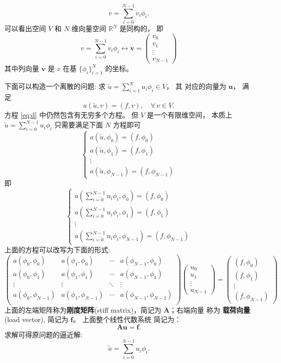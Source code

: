 \documentclass{article}
\begin{document}
$$
v = \sum\limits_{i=0}^{N-1} v_i\phi_i.
$$
可以看出空间 $V$ 和 $N$ 维向量空间 $\mathbb{R}^N$ 是同构的， 即
$$
v = \sum\limits_{i=0}^{N-1} v_i\phi_i\leftrightarrow\mathbf{v} =
\begin{pmatrix}
    v_0 \\ v_1 \\ \vdots \\ v_{N-1}
\end{pmatrix}
$$
其中列向量 $\mathbf{v}$ 是 $v$ 在基 $\{\phi_i\}_{i=1}^N$ 的坐标。 

下面可以构造一个离散的问题: 求 $ \tilde u = \sum_{i=1}^{N}u_i \phi_i \in V$， 其
对应的向量为 $\mathbf u$， 满足
\begin{equation}
    \label{eq:d}
    a(\tilde u, v) = (f, v),
    \quad\forall~v\in V.
\end{equation}
方程 \eqref{eq:d} 中仍然包含有无穷多个方程。 但 $V$ 是一个有限维空间， 本质上
$\tilde u= \sum_{i=0}^{N-1}u_i \phi_i$ 只需要满足下面 $N$ 方程即可
$$
\begin{cases}
    a(\tilde u, \phi_0) = (f, \phi_0) \\
    a(\tilde u, \phi_1) = (f, \phi_1) \\
    \vdots \\
    a(\tilde u, \phi_{N-1}) = (f, \phi_{N-1})
\end{cases}
$$
即
$$
\begin{cases}
    a(\sum_{i=0}^{N-1}u_i \phi_i, \phi_0) = (f, \phi_0) \\
    a(\sum_{i=0}^{N-1}u_i \phi_i, \phi_1) = (f, \phi_1) \\
    \vdots \\
    a(\sum_{i=0}^{N-1}u_i \phi_i, \phi_{N-1}) = (f, \phi_{N-1})
\end{cases}
$$
上面的方程可以改写为下面的形式:
$$
\begin{pmatrix}
    a(\phi_0, \phi_0) & a(\phi_1, \phi_0) & \cdots & a(\phi_{N-1}, \phi_0) \\
    a(\phi_0, \phi_1) & a(\phi_1, \phi_1) & \cdots & a(\phi_{N-1}, \phi_1) \\
    \vdots & \vdots & \ddots & \vdots \\
    a(\phi_0, \phi_{N-1}) & a(\phi_1, \phi_{N-1}) & \cdots & a(\phi_{N-1},
    \phi_{N-1}) \\
\end{pmatrix}
\begin{pmatrix}
    u_0 \\ u_1 \\ \vdots \\ u_{N-1}
\end{pmatrix}
=
\begin{pmatrix}
    (f, \phi_0) \\ (f, \phi_1) \\ \vdots \\ (f, \phi_{N-1})
\end{pmatrix}
$$
上面的左端矩阵称为{\bf 刚度矩阵}(stiff matrix)，简记为 $\mathbf A$；右端向量
称为 {\bf 载荷向量} (load vector), 简记为 $\mathbf f$。 上面整个线性代数系统
简记为：
$$
\mathbf A\mathbf u = \mathbf f.
$$
求解可得原问题的逼近解:
$$
\tilde u = \sum\limits_{i=0}^{N-1} u_i\phi_i.
$$

\cite{wei_fealpy}


\end{document}
